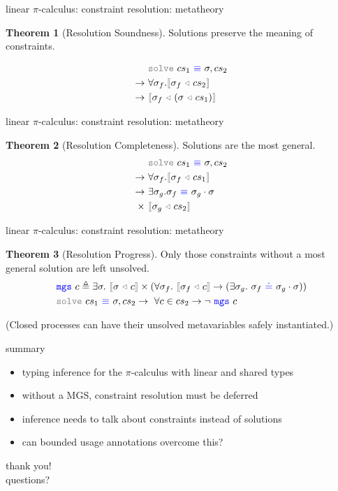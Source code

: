 \documentclass[dvipsnames]{beamer}
\newcommand{\sitem}{\item[\raisebox{.45ex}{\rule{.6ex}{.6ex}}]}
\theoremstyle{definition}\newtheorem{mytheorem}{Theorem}[section]
\newcommand{\picalc}{$\pi$-calculus}
\newcommand{\func}[1]{\textcolor{gray}{\mathtt{#1}}}
\newcommand{\type}[1]{\textcolor{blue}{\mathtt{#1}}}
\newcommand{\tEq}[2]{#1~\type{\equiv}~#2}
\newcommand{\subst}[2]{#1 ~ \func{\triangleleft} ~ #2}
\newcommand{\interpr}[1]{\func{[\![} #1 \func{]\!]}}
\begin{document}
\begin{frame}{linear \picalc{}: constraint resolution: metatheory}
\begin{mytheorem}[Resolution Soundness]\label{resolution-soundness}
Solutions preserve the meaning of constraints.
\end{mytheorem}
\[
\begin{aligned}[c]
& \func{solve}~cs_1 \tEq{} \sigma , cs_2 \\
\to ~ & \forall \sigma_f . \interpr{\subst{\sigma_f}{cs_2}} \\
\to ~ & \interpr{\subst{\sigma_f}{(\subst{\sigma}{cs_1})}}
\end{aligned}
\]
\end{frame}

\begin{frame}{linear \picalc{}: constraint resolution: metatheory}
\begin{mytheorem}[Resolution Completeness]\label{resolution-completeness}
Solutions are the most general.
\[
\begin{aligned}[c]
& \func{solve}~cs_1 \tEq{} \sigma , cs_2 \\
\to ~ & \forall \sigma_f . \interpr{\subst{\sigma_f}{cs_1}} \\
\to ~ & \exists \sigma_g . \sigma_f \tEq{} \sigma_g \cdot \sigma \\
\times ~ & \interpr{\subst{\sigma_g}{cs_2}}
\end{aligned}
\]
\end{mytheorem}
\end{frame}

\begin{frame}{linear \picalc{}: constraint resolution: metatheory}
\begin{mytheorem}[Resolution Progress]\label{resolution-progress}
Only those constraints without a most general solution are left unsolved.
\[
\begin{aligned}[c]
& \type{mgs} ~ c \triangleq \exists \sigma. ~ \interpr{\subst{\sigma}{c}} \times (\forall \sigma_f . ~ \interpr{\subst{\sigma_f}{c}} \to (\exists \sigma_g. ~ \sigma_f ~ \type{\doteq} ~ \sigma_g \cdot \sigma)) \\
& \func{solve}~cs_1 \tEq{} \sigma , cs_2 \to ~ \forall c \in cs_2 \to \neg ~ \type{mgs} ~ c
\end{aligned}
\]
\end{mytheorem}

(Closed processes can have their unsolved metavariables safely instantiated.)
\end{frame}

\begin{frame}{summary}
\begin{itemize}
\setlength\itemsep{1em}
\sitem typing inference for the \picalc{} with linear and shared types
\sitem without a MGS, constraint resolution must be deferred
\sitem inference needs to talk about constraints instead of solutions
\sitem can bounded usage annotations overcome this? 
\end{itemize}
\end{frame}

\begin{frame}
  \centering
  \Huge{thank you!} \\
  \Huge{questions?}
\end{frame}
\end{document}
